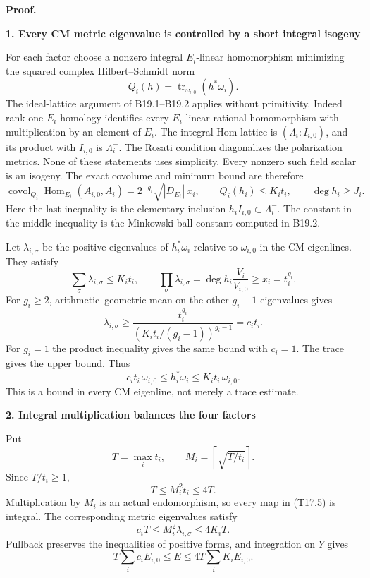 \documentclass[11pt,a4paper]{article}
\theoremstyle{definition}
\begin{document}
\textbf{Proof.}

\textbf{1. Every CM metric eigenvalue is controlled by a short integral isogeny}

For each factor choose a nonzero integral \(E_i\)-linear homomorphism minimizing the squared complex Hilbert--Schmidt norm \[
Q_i(h)=\operatorname{tr}_{\omega_{i,0}}(h^*\omega_i).
\] The ideal-lattice argument of B19.1--B19.2 applies without primitivity. Indeed rank-one \(E_i\)-homology identifies every \(E_i\)-linear rational homomorphism with multiplication by an element of \(E_i\). The integral Hom lattice is \((\Lambda_i:I_{i,0})\), and its product with \(I_{i,0}\) is \(\Lambda_i^-\). The Rosati condition diagonalizes the polarization metrics. None of these statements uses simplicity. Every nonzero such field scalar is an isogeny. The exact covolume and minimum bound are therefore \[
\operatorname{covol}_{Q_i}\operatorname{Hom}_{E_i}(A_{i,0},A_i)
=2^{-g_i}\sqrt{|D_{E_i}|}\,x_i,
\qquad Q_i(h_i)\le K_i t_i,
\qquad \deg h_i\ge J_i.
\tag{T17.8}
\] Here the last inequality is the elementary inclusion \(h_i I_{i,0}\subset\Lambda_i^-\). The constant in the middle inequality is the Minkowski ball constant computed in B19.2.

Let \(\lambda_{i,\sigma}\) be the positive eigenvalues of \(h_i^*\omega_i\) relative to \(\omega_{i,0}\) in the CM eigenlines. They satisfy \[
\sum_\sigma\lambda_{i,\sigma}\le K_i t_i,
\qquad
\prod_\sigma\lambda_{i,\sigma}
=\deg h_i\frac{V_i}{V_{i,0}}\ge x_i=t_i^{g_i}.
\tag{T17.9}
\] For \(g_i\ge2\), arithmetic--geometric mean on the other \(g_i-1\) eigenvalues gives \[
\lambda_{i,\sigma}
\ge\frac{t_i^{g_i}}
           {(K_i t_i/(g_i-1))^{g_i-1}}
=c_i t_i.
\] For \(g_i=1\) the product inequality gives the same bound with \(c_i=1\). The trace gives the upper bound. Thus \[
c_i t_i\,\omega_{i,0}
\le h_i^*\omega_i\le K_i t_i\,\omega_{i,0}.
\tag{T17.10}
\] This is a bound in every CM eigenline, not merely a trace estimate.

\textbf{2. Integral multiplication balances the four factors}

Put \[
T=\max_i t_i,\qquad
M_i=\left\lceil\sqrt{T/t_i}\right\rceil.
\tag{T17.11}
\] Since \(T/t_i\ge1\), \[
T\le M_i^2t_i\le4T.
\] Multiplication by \(M_i\) is an actual endomorphism, so every map in (T17.5) is integral. The corresponding metric eigenvalues satisfy \[
c_iT\le M_i^2\lambda_{i,\sigma}\le4K_iT.
\tag{T17.12}
\] Pullback preserves the inequalities of positive forms, and integration on \(Y\) gives \[
T\sum_i c_i E_{i,0}\le E\le4T\sum_iK_iE_{i,0}.
\tag{T17.13}
\]
\end{document}
